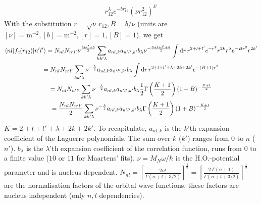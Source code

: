 \documentclass[10pt]{article}
\begin{document}
\begin{itemize}
\begin{multline*}
r_{12}^{\lambda} e^{-b r_{12}^{2}} ( \nu r_{12}^{2})^{k'}
	\end{multline*}
	With the substitution $r = \sqrt{\nu} \, r_{12}, B = b/\nu$ (units are 
$[\nu] = \text{m}^{-2}, [b] = \text{m}^{-2}, [r] = 1, [B] = 1$), we get
	\begin{multline}
		\braket{ n l |  f_{c}(r_{12}) | n' l'} = N_{nl} N_{n'l'} 
\nu^{\frac{l + l' + 3}{2}} \sum_{kk'\lambda} a_{nl,k} a_{n'l',k'} b_{\lambda}  
\nu^{- \frac{3 + l + l' + \lambda}{2}} \int \text{d} r \, r^{2+l+l'} e^{-r^{2}} 
r^{2k} r^{\lambda} e^{-B r^{2}} r^{2k'} \\
		= N_{nl} N_{n'l'} \sum_{kk'\lambda} \nu^{-\frac{\lambda}{2}}  
a_{nl,k} a_{n'l',k'} b_{\lambda} \int \text{d} r \, r^{2+l+l'+\lambda + 2k + 
2k'} e^{-(B+1) r^{2}} \\
		=  N_{nl} N_{n'l'}  \sum_{kk'\lambda} \nu^{-\frac{\lambda}{2}} 
a_{nl,k} a_{n'l',k'} b_{\lambda} \frac{1}{2} \Gamma \left( \frac{K+1}{2} 
\right) (1 + B)^{-\frac{K+1}{2}} \\
		= \frac{N_{nl} N_{n'l'}}{2}  \sum_{kk'\lambda} 
\nu^{-\frac{\lambda}{2}} a_{nl,k} a_{n'l',k'} b_{\lambda} \Gamma \left( 
\frac{K+1}{2} \right) (1 + B)^{-\frac{K+1}{2}}
		\label{eq:central_corr_single}
	\end{multline}
	$K = 2+l+l'+ \lambda + 2k + 2k'$. To recapitulate, $a_{nl,k}$ is the 
$k$'th expansion coefficient of the Laguerre polynomials. The sum over $k$ 
($k'$) ranges from $0$ to $n$ ($n'$). $b_{\lambda}$ is the $\lambda$'th 
expansion coefficient of the correlation function, runs from $0$ to a finite 
value ($10$ or $11$ for Maartens' fits). $\nu = M_N \omega /\hbar$ is the 
H.O.-potential parameter and is nucleus dependent. $N_{nl} = \left[ 
\frac{2n!}{\Gamma(n + l + 3/2)} \right]^{\frac{1}{2}} = \left[ \frac{ 2 \, 
\Gamma( n + 1)}{\Gamma(n + l + 3/2)} \right]^{\frac{1}{2}} $ are the 
normalisation factors of the orbital wave functions, these factors are nucleus 
independent (only $n,l$ dependencies).


\end{itemize}
\end{document}
